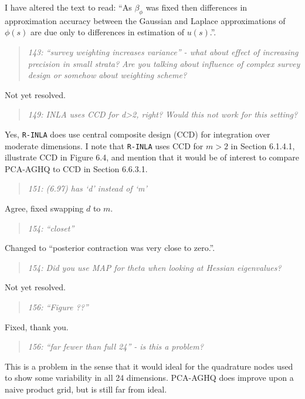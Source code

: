\documentclass[
  12pt,
]{article}
\begin{document}
I have altered the text to read: ``As \(\beta_\phi\) was fixed then
differences in approximation accuracy between the Gaussian and Laplace
approximations of \(\phi(s)\) are due only to differences in estimation
of \(u(s)\).''.

\begin{quote}
\emph{143: ``survey weighting increases variance'' - what about effect
of increasing precision in small strata? Are you talking about influence
of complex survey design or somehow about weighting scheme?}
\end{quote}

Not yet resolved.

\begin{quote}
\emph{149: INLA uses CCD for d\textgreater2, right? Would this not work
for this setting?}
\end{quote}

Yes, \texttt{R-INLA} does use central composite design (CCD) for
integration over moderate dimensions. I note that \texttt{R-INLA} uses
CCD for \(m > 2\) in Section 6.1.4.1, illustrate CCD in Figure 6.4, and
mention that it would be of interest to compare PCA-AGHQ to CCD in
Section 6.6.3.1.

\begin{quote}
\emph{151: (6.97) has `d' instead of `m'}
\end{quote}

Agree, fixed swapping \(d\) to \(m\).

\begin{quote}
\emph{154: ``closet''}
\end{quote}

Changed to ``posterior contraction was very close to zero.''.

\begin{quote}
\emph{154: Did you use MAP for theta when looking at Hessian
eigenvalues?}
\end{quote}

Not yet resolved.

\begin{quote}
\emph{156: ``Figure ??''}
\end{quote}

Fixed, thank you.

\begin{quote}
\emph{156: ``far fewer than full 24'' - is this a problem?}
\end{quote}

This is a problem in the sense that it would ideal for the quadrature
nodes used to show some variability in all 24 dimensions. PCA-AGHQ does
improve upon a naive product grid, but is still far from ideal.
\end{document}
